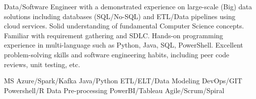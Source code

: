\documentclass[a4paper]{ReadableCV}
\begin{document}
	






\showHeader



Data/Software Engineer with a demonstrated experience on large-scale (Big) data solutions including databases (SQL/No-SQL) and ETL/Data pipelines using cloud services. Solid understanding of fundamental Computer Science concepts. Familiar with requirement gathering and SDLC. Hands-on programming experience in multi-language such as Python, Java, SQL, PowerShell. Excellent problem-solving skills and software engineering habits, including peer code reviews, unit testing, etc.


	      {MS Azure/Spark/Kafka}
		  {Java/Python}
		  {ETL/ELT/Data Modeling}
		  {DevOps/GIT}
		  {Powershell/R}
		  {Data Pre-processing}
		  {PowerBI/Tableau}
		  {Agile/Scrum/Spiral}
		  

\end{document}
